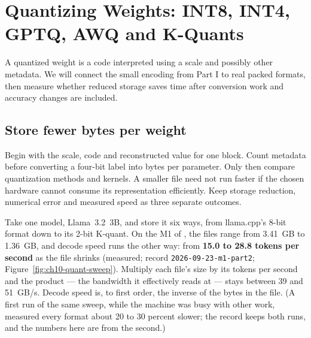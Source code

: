 \chapter{Quantizing Weights: INT8, INT4, GPTQ, AWQ and K-Quants}\label{ch:weight-quantization}

\begin{ChapterIntent}
A quantized weight is a code interpreted using a scale and possibly other metadata. We
will connect the small encoding from Part I to real packed formats, then measure whether
reduced storage saves time after conversion work and accuracy changes are included.
\end{ChapterIntent}

\section*{Store fewer bytes per weight}
Begin with the scale, code and reconstructed value for one block. Count metadata before
converting a four-bit label into bytes per parameter. Only then compare quantization
methods and kernels. A smaller file need not run faster if the chosen hardware cannot
consume its representation efficiently. Keep storage reduction, numerical error and
measured speed as three separate outcomes.


Take one model, Llama~3.2~3B, and store it six ways, from llama.cpp's 8-bit
format down to its 2-bit K-quant. On the M1 of , the files
range from 3.41~GB to 1.36~GB, and decode speed runs the other way: from
\textbf{15.0 to 28.8 tokens per second} as the file shrinks
(measured; record \texttt{2026-09-23-m1-part2};
Figure~\ref{fig:ch10-quant-sweep}). Multiply each file's size by its tokens
per second and the product --- the bandwidth it effectively reads at --- stays
between 39 and 51~GB/s. Decode speed is, to first order, the inverse of the
bytes in the file. (A first run of the same sweep, while the machine was busy
with other work, measured every format about 20 to 30 percent slower; the
record keeps both runs, and the numbers here are from the second.)

